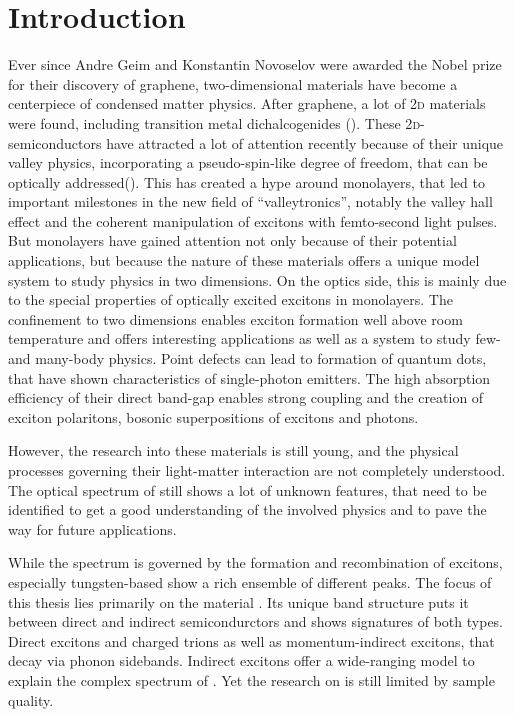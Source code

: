 \chapter{Introduction}
Ever since Andre Geim and Konstantin Novoselov were awarded the Nobel prize for their discovery of graphene, two-dimensional materials have become a centerpiece of condensed matter physics. After graphene, a lot of 2\textsc{d} materials were found, including transition metal dichalcogenides (\tmds\!). These 2\textsc{d}-semiconductors have attracted a lot of attention recently because of their unique valley physics, incorporating a pseudo-spin-like degree of freedom, that can be optically addressed(). This has created a hype around \tmdg monolayers, that led to important milestones in the new field of ``valleytronics'', notably the valley hall effect\cite{mak_valley_2014} and the coherent manipulation of excitons with femto-second light pulses\cite{langer_lightwave_2018}. But \tmdg monolayers have gained attention not only because of their potential applications, but because the nature of these materials offers a unique model system to study physics in two dimensions. On the optics side, this is mainly due to the special properties of optically excited excitons in \tmdg monolayers. The confinement to two dimensions enables exciton formation well above room temperature and offers interesting applications as well as a system to study few- and many-body physics. Point defects can lead to formation of quantum dots, that have shown characteristics of single-photon emitters. The high absorption efficiency of their direct band-gap enables strong coupling and the creation of exciton polaritons, bosonic superpositions of excitons and photons.

However, the research into these materials is still young, and the physical processes governing their light-matter interaction are not completely understood. The optical spectrum of \tmds still shows a lot of unknown features, that need to be identified to get a good understanding of the involved physics and to pave the way for future applications. 

While the spectrum is governed by the formation and recombination of excitons, especially tungsten-based \tmds show a rich ensemble of different peaks. The focus of this thesis lies primarily on the material \wse\!. Its unique band structure puts it between direct and indirect semicondurctors and shows signatures of both types. Direct excitons and charged trions as well as momentum-indirect excitons, that decay via phonon sidebands. Indirect excitons offer a wide-ranging model to explain the complex spectrum of \wse\!. Yet the research on \tmds is still limited by sample quality. 

